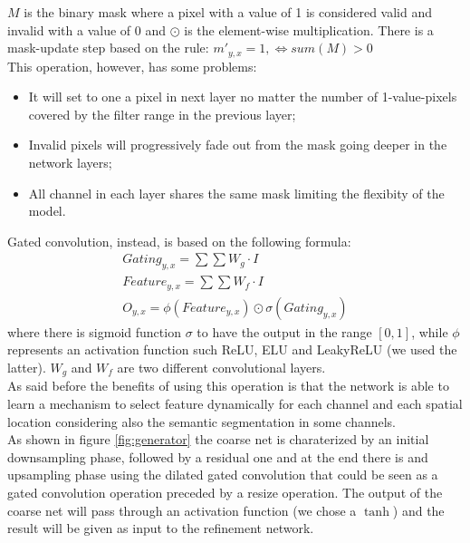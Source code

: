 \documentclass[10pt,twocolumn,letterpaper]{article}
\begin{document}
\(M\) is the binary mask where a pixel with a value of 1 is considered valid and
invalid with a value of 0 and \(\odot\) is the element-wise multiplication.
There is a mask-update step based on the rule: \(m'_{y,x} = 1, \iff sum(M) > 0\)
\\
This operation, however, has some problems:
\begin{itemize}
    \item It will set to one a pixel in next layer no matter the number of
      1-value-pixels covered by the filter range in the previous layer;
    \item Invalid pixels will progressively fade out from the mask going deeper
      in the network layers;
    \item All channel in each layer shares the same mask limiting the flexibity
      of the model.
\end{itemize}
Gated convolution, instead, is based on the following formula:
\begin{gather}
    Gating_{y,x} = \sum \sum W_g \cdot I \\
    Feature_{y,x} = \sum \sum W_f \cdot I \\
    O_{y,x} = \phi (Feature_{y,x}) \odot \sigma (Gating_{y,x})
\end{gather}
where there is sigmoid function \(\sigma\) to have the output in the range
\([0,1]\), while \(\phi\) represents an activation function such ReLU, ELU and
LeakyReLU (we used the latter). \(W_g\) and \(W_f\) are two different
convolutional layers.
\\
As said before the benefits of using this operation is that the network is able
to learn a mechanism to select feature dynamically for each channel and each
spatial location considering also the semantic segmentation in some channels.
\\
As shown in figure \ref{fig:generator} the coarse net is
charaterized by an initial downsampling phase, followed by a residual one
and at the end there is and upsampling phase using the dilated gated convolution
that could be seen as a gated convolution operation preceded by a resize
operation. The output of the coarse net will pass through an activation function
(we chose a \(\tanh\)) and the result will be given as input to the refinement
network.
\end{document}
